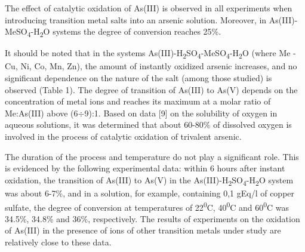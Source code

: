 \begin{multicols}{2}
The effect of catalytic oxidation of As(III) is observed in all
experiments when introducing transition metal salts into an arsenic
solution. Moreover, in As(III)-MeSO\textsubscript{4}-H\textsubscript{2}O
systems the degree of conversion reaches 25\%.

It should be noted that in the systems
As(III)-H\textsubscript{2}SO\textsubscript{4}-MeSO\textsubscript{4}-H\textsubscript{2}O
(where Me - Cu, Ni, Co, Mn, Zn), the amount of instantly oxidized
arsenic increases, and no significant dependence on the nature of the
salt (among those studied) is observed (Table 1). The degree of
transition of As(III) to As(V) depends on the concentration of metal
ions and reaches its maximum at a molar ratio of Me:As(III) above
(6$\div$9):1.
Based on data {[}9{]} on the solubility of oxygen in aqueous solutions,
it was determined that about 60-80\% of dissolved oxygen is involved in
the process of catalytic oxidation of trivalent arsenic.

The duration of the process and temperature do not play a significant
role. This is evidenced by the following experimental data: within 6
hours after instant oxidation, the transition of As(III) to As(V) in the
As(III)-H\textsubscript{2}SO\textsubscript{4}-H\textsubscript{2}O system
was about 6-7\%, and in a solution, for example, containing 0,1 gEq/l of
copper sulfate, the degree of conversion at temperatures of
22\textsuperscript{0}C, 40\textsuperscript{0}C and
60\textsuperscript{0}C was 34.5\%, 34.8\% and 36\%, respectively. The
results of experiments on the oxidation of As(III) in the presence of
ions of other transition metals under study are relatively close to
these data.
\end{multicols}

